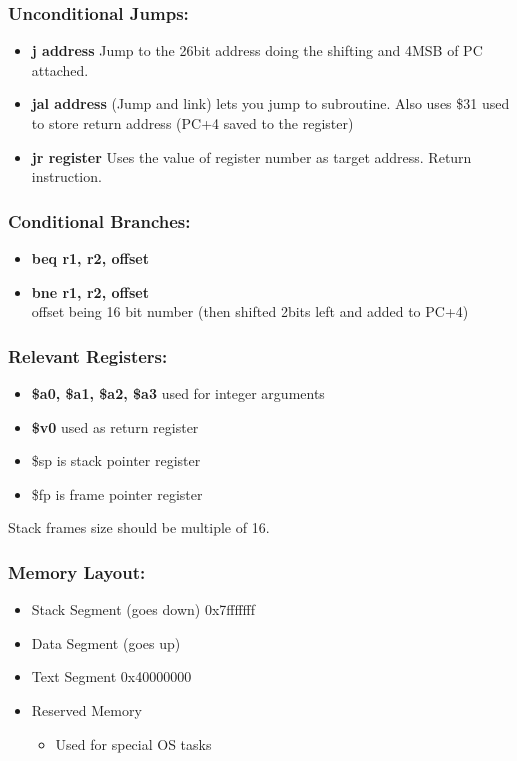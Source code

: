 \documentclass{article}
\newcommand\tab[1][0.5cm]{\hspace*{#1}}
\begin{document}
		\subsubsection*{Unconditional Jumps:}
		\begin{itemize}
			\item \textbf{j address} Jump to the 26bit address doing the shifting and 4MSB of PC attached.
			\item \textbf{jal address} (Jump and link) lets you jump to subroutine. Also uses \$31 used to store return address (PC+4 saved to the register)
			\item \textbf{jr register} Uses the value of register number as target address. Return instruction.
		\end{itemize}

		\subsubsection*{Conditional Branches:}
		\begin{itemize}
			\item \textbf{beq r1, r2, offset} 
			\item \textbf{bne r1, r2, offset} \\
			offset being 16 bit number (then shifted 2bits left and added to PC+4)
		\end{itemize}

		\subsubsection*{Relevant Registers:}
		\begin{itemize}
			\item \textbf{\$a0, \$a1, \$a2, \$a3} used for integer arguments
			\item \textbf{\$v0} used as return register
			\item \$sp is stack pointer register
			\item \$fp is frame pointer register
		\end{itemize}

		Stack frames size should be multiple of 16.

		\subsubsection*{Memory Layout:}
		\begin{itemize}
			\item Stack Segment (goes down) \tab 0x7fffffff
			\item Data Segment (goes up)
			\item Text Segment \tab[2.5cm] 0x40000000
			\item Reserved Memory
			\begin{itemize}
				\item Used for special OS tasks
			\end{itemize}
		\end{itemize}
\end{document}
